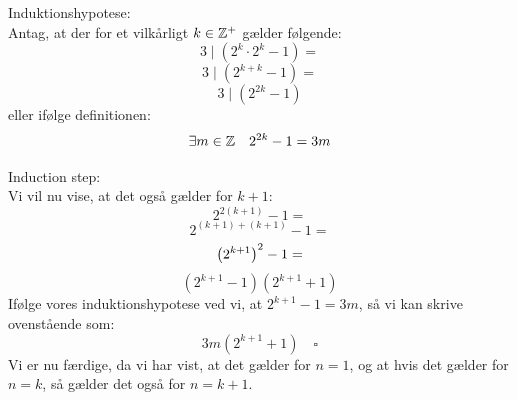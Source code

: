 \documentclass[a4paper,12pt]{article}
\begin{document}
Induktionshypotese:\\
Antag, at der for et vilkårligt $k \in \mathbb{Z}^+$ gælder følgende:\\
\[3 \mid (2^k \cdot 2^k - 1) = \]
\[3 \mid (2^{k+k} - 1) = \]
\[3 \mid (2^{2k} - 1)\]
eller ifølge definitionen:\\
\[\exists m\in \mathbb{Z} \quad 2^{2k} - 1 = 3m\]

Induction step:\\
Vi vil nu vise, at det også gælder for $k+1$:\\
\[2^{2(k+1)} - 1 = \]
\[2^{(k+1)+(k+1)} - 1 = \]
\[\left( 2^{k+1}\right)^2 - 1 = \]
\[(2^{k+1} - 1)(2^{k+1} + 1)\]
Ifølge vores induktionshypotese ved vi, at $2^{k+1} - 1 = 3m$, så vi kan skrive ovenstående som:
\[3m(2^{k+1} + 1) \quad \square\]
Vi er nu færdige, da vi har vist, at det gælder for $n = 1$, og at hvis det gælder for $n = k$, så gælder det også for $n = k+1$.
\end{document}
